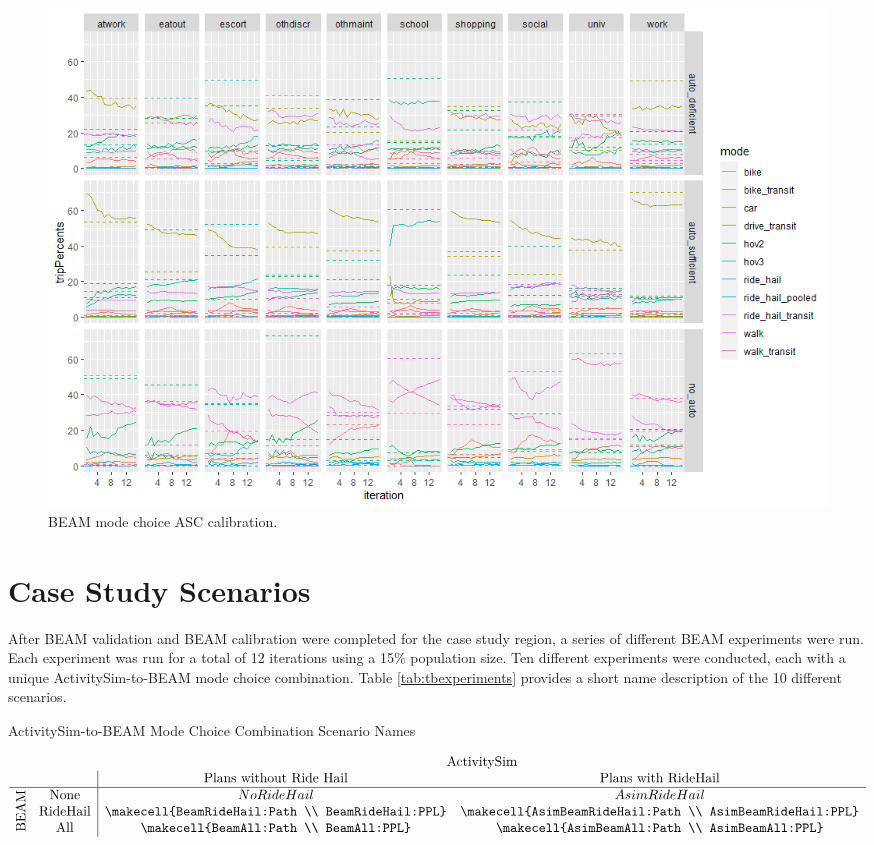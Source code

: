 \documentclass[fancy, masters]{byuthesis}
\begin{document}
\begin{figure}

{\centering \includegraphics[width=1\linewidth]{pics/BeamCalib} 

}

\caption{BEAM mode choice ASC calibration.}\label{fig:fig-beam-calib}
\end{figure}

\hypertarget{meth-scenarios}{%
\section{Case Study Scenarios}\label{meth-scenarios}}

After BEAM validation and BEAM calibration were completed for the case study region, a series of different BEAM experiments were run. Each experiment was run for a total of 12 iterations using a 15\% population size. Ten different experiments were conducted, each with a unique ActivitySim-to-BEAM mode choice combination. Table \ref{tab:tbexperiments} provides a short name description of the 10 different scenarios.

\begin{table}
\caption{ActivitySim-to-BEAM Mode Choice Combination Scenario Names}
\renewcommand{\arraystretch}{2}
\[
  \begin{array}{cc|ccc}
    &\multicolumn{1}{c}{} & \multicolumn{2}{c}{\text{ActivitySim}} \\
    && \text{Plans without Ride Hail} & \text{Plans with RideHail}\\
    \hline
    & \text{None} & No RideHail & AsimRideHail \\
    \smash{\rotatebox[origin=c]{90}{\text{BEAM}}} & \text{RideHail} & \makecell{BeamRideHail:Path \\ BeamRideHail:PPL} & \makecell{AsimBeamRideHail:Path \\ AsimBeamRideHail:PPL} \\
    & \text{All} & \makecell{BeamAll:Path \\ BeamAll:PPL} & \makecell{AsimBeamAll:Path \\ AsimBeamAll:PPL}
  \end{array}
\]
\label{tab:tbexperiments}
\end{table}
\end{document}
